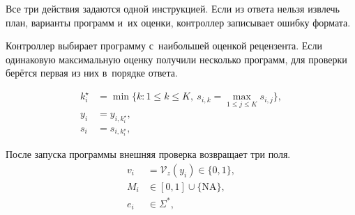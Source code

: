 Все три действия задаются одной инструкцией. Если из ответа нельзя извлечь план, варианты программ и~их оценки, контроллер записывает ошибку формата.

Контроллер выбирает программу с~наибольшей оценкой рецензента. Если одинаковую максимальную оценку получили несколько программ, для проверки берётся первая из них в~порядке ответа.
\begin{formulakey}
\begin{equation*}
\begin{aligned}
 k_i^\star &= \min\{k: 1\le k\le K,\ s_{i,k}=\max_{1\le j\le K}s_{i,j}\},\\
 y_i &=y_{i,k_i^\star},\\
 s_i &=s_{i,k_i^\star},
\end{aligned}
\end{equation*}
\begin{symbols}
\end{symbols}
\end{formulakey}
\begin{formulakey}
После запуска программы внешняя проверка возвращает три поля.
\nopagebreak
\begin{equation*}
\begin{aligned}
 v_i &= \mathcal V_z(y_i)\in\{0,1\},\\
 M_i &\in [0,1]\cup\{\mathrm{NA}\},\\
 e_i &\in\Sigma^*,
\end{aligned}
\end{equation*}
\begin{symbols}
\end{symbols}
\end{formulakey}

